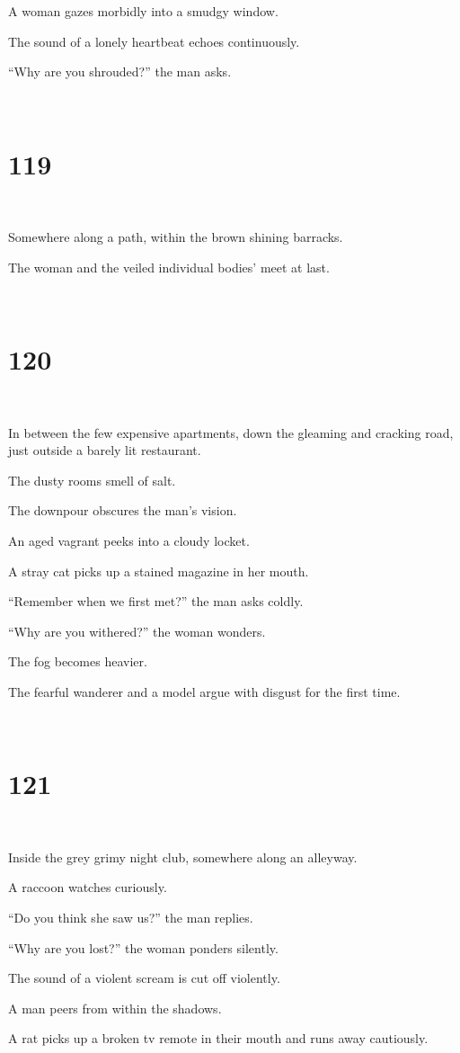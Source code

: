 \documentclass{report}
\begin{document}
A woman gazes morbidly into a smudgy window.

The sound of a lonely heartbeat echoes continuously.

``Why are you shrouded?'' the man asks.

~
\chapter*{119}
~

Somewhere along a path, within the brown shining barracks.

The woman and the veiled individual bodies' meet at last.

~
\chapter*{120}
~

In between the few expensive apartments, down the gleaming and cracking road, just outside a barely lit restaurant.

The dusty rooms smell of salt.

The downpour obscures the man's vision.

An aged vagrant peeks into a cloudy locket.

A stray cat picks up a stained magazine in her mouth.

``Remember when we first met?'' the man asks coldly.

``Why are you withered?'' the woman wonders.

The fog becomes heavier.

The fearful wanderer and a model argue with disgust for the first time.

~
\chapter*{121}
~

Inside the grey grimy night club, somewhere along an alleyway.

A raccoon watches curiously.

``Do you think she saw us?'' the man replies.

``Why are you lost?'' the woman ponders silently.

The sound of a violent scream is cut off violently.

A man peers from within the shadows.

A rat picks up a broken tv remote in their mouth and runs away cautiously.
\end{document}
